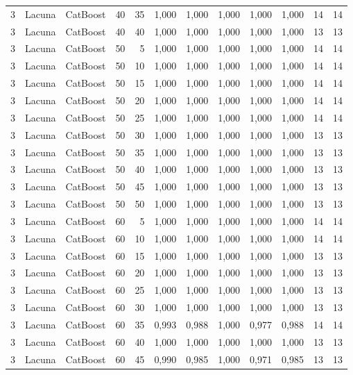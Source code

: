 \begin{longtable}{@{}rllrrrrrrrrr@{}}
3 & Lacuna & CatBoost & 40 & 35 & 1,000 & 1,000 & 1,000 & 1,000 & 1,000 & 14 & 14 \\
3 & Lacuna & CatBoost & 40 & 40 & 1,000 & 1,000 & 1,000 & 1,000 & 1,000 & 13 & 13 \\
3 & Lacuna & CatBoost & 50 & 5 & 1,000 & 1,000 & 1,000 & 1,000 & 1,000 & 14 & 14 \\
3 & Lacuna & CatBoost & 50 & 10 & 1,000 & 1,000 & 1,000 & 1,000 & 1,000 & 14 & 14 \\
3 & Lacuna & CatBoost & 50 & 15 & 1,000 & 1,000 & 1,000 & 1,000 & 1,000 & 14 & 14 \\
3 & Lacuna & CatBoost & 50 & 20 & 1,000 & 1,000 & 1,000 & 1,000 & 1,000 & 14 & 14 \\
3 & Lacuna & CatBoost & 50 & 25 & 1,000 & 1,000 & 1,000 & 1,000 & 1,000 & 14 & 14 \\
3 & Lacuna & CatBoost & 50 & 30 & 1,000 & 1,000 & 1,000 & 1,000 & 1,000 & 13 & 13 \\
3 & Lacuna & CatBoost & 50 & 35 & 1,000 & 1,000 & 1,000 & 1,000 & 1,000 & 13 & 13 \\
3 & Lacuna & CatBoost & 50 & 40 & 1,000 & 1,000 & 1,000 & 1,000 & 1,000 & 13 & 13 \\
3 & Lacuna & CatBoost & 50 & 45 & 1,000 & 1,000 & 1,000 & 1,000 & 1,000 & 13 & 13 \\
3 & Lacuna & CatBoost & 50 & 50 & 1,000 & 1,000 & 1,000 & 1,000 & 1,000 & 13 & 13 \\
3 & Lacuna & CatBoost & 60 & 5 & 1,000 & 1,000 & 1,000 & 1,000 & 1,000 & 14 & 14 \\
3 & Lacuna & CatBoost & 60 & 10 & 1,000 & 1,000 & 1,000 & 1,000 & 1,000 & 14 & 14 \\
3 & Lacuna & CatBoost & 60 & 15 & 1,000 & 1,000 & 1,000 & 1,000 & 1,000 & 13 & 13 \\
3 & Lacuna & CatBoost & 60 & 20 & 1,000 & 1,000 & 1,000 & 1,000 & 1,000 & 13 & 13 \\
3 & Lacuna & CatBoost & 60 & 25 & 1,000 & 1,000 & 1,000 & 1,000 & 1,000 & 13 & 13 \\
3 & Lacuna & CatBoost & 60 & 30 & 1,000 & 1,000 & 1,000 & 1,000 & 1,000 & 13 & 13 \\
3 & Lacuna & CatBoost & 60 & 35 & 0,993 & 0,988 & 1,000 & 0,977 & 0,988 & 14 & 14 \\
3 & Lacuna & CatBoost & 60 & 40 & 1,000 & 1,000 & 1,000 & 1,000 & 1,000 & 13 & 13 \\
3 & Lacuna & CatBoost & 60 & 45 & 0,990 & 0,985 & 1,000 & 0,971 & 0,985 & 13 & 13 \\

\end{longtable}
